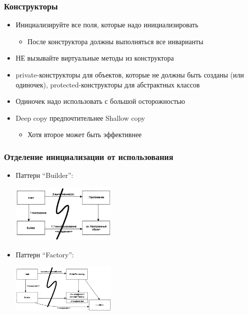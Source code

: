\documentclass{../mcsslides}
\begin{document}
    \begin{frame}
        \frametitle{Конструкторы}
        \begin{itemize}
            \item Инициализируйте все поля, которые надо инициализировать
            \begin{itemize}
                \item После конструктора должны выполняться все инварианты
            \end{itemize}
            \item НЕ вызывайте виртуальные методы из конструктора
            \item private-конструкторы для объектов, которые не должны быть созданы (или одиночек), protected-конструкторы для абстрактных классов
            \item Одиночек надо использовать с большой осторожностью
            \item Deep copy предпочтительнее Shallow copy
            \begin{itemize}
                \item Хотя второе может быть эффективнее
            \end{itemize}
        \end{itemize}
    \end{frame}

    \begin{frame}
        \frametitle{Отделение инициализации от использования}
        \begin{itemize}
            \item Паттерн ``Builder'':
                \begin{center}
                    \includegraphics[width=0.4\textwidth]{builder.png}
                \end{center}
            \item Паттерн ``Factory'':
                \begin{center}
                    \includegraphics[width=0.4\textwidth]{factory.png}
                \end{center}
        \end{itemize}
    \end{frame}
\end{document}
